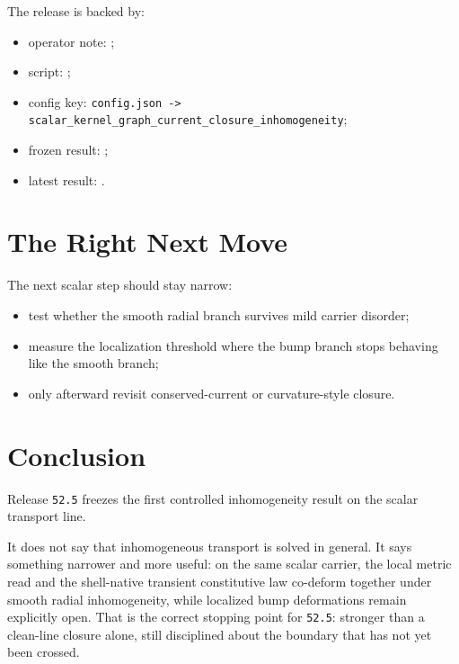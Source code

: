 \documentclass[11pt]{article}
\begin{document}
The release is backed by:
\begin{itemize}
\item operator note: ;
\item script: ;
\item config key: \texttt{config.json -> scalar\_kernel\_graph\_current\_closure\_inhomogeneity};
\item frozen result: ;
\item latest result: .
\end{itemize}

\section{The Right Next Move}

The next scalar step should stay narrow:
\begin{itemize}
\item test whether the smooth radial branch survives mild carrier disorder;
\item measure the localization threshold where the bump branch stops behaving like the smooth branch;
\item only afterward revisit conserved-current or curvature-style closure.
\end{itemize}

\section{Conclusion}

Release \texttt{52.5} freezes the first controlled inhomogeneity result on the scalar transport line.

It does not say that inhomogeneous transport is solved in general. It says something narrower and more useful: on the same scalar carrier, the local metric read and the shell-native transient constitutive law co-deform together under smooth radial inhomogeneity, while localized bump deformations remain explicitly open. That is the correct stopping point for \texttt{52.5}: stronger than a clean-line closure alone, still disciplined about the boundary that has not yet been crossed.
\end{document}
